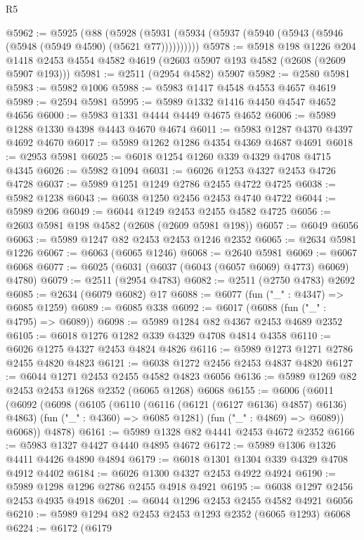 \begin{lexlean}{R5}
\begin{coremodule}
@5962 := @5925
    (@88 (@5928 (@5931 (@5934 (@5937 (@5940 (@5943 (@5946 (@5948 (@5949 @4590) (@5621 @77))))))))))
@5978 := @5918
    @198
    @1226
    @204
    @1418
    @2453
    @4554
    @4582
    @4619
    (@2603 @5907 @193 @4582 (@2608 (@2609 @5907 @193)))
@5981 := @2511 (@2954 @4582) @5907
@5982 := @2580 @5981
@5983 := @5982 @1006
@5988 := @5983 @1417 @4548 @4553 @4657 @4619
@5989 := @2594 @5981
@5995 := @5989 @1332 @1416 @4450 @4547 @4652 @4656
@6000 := @5983 @1331 @4444 @4449 @4675 @4652
@6006 := @5989 @1288 @1330 @4398 @4443 @4670 @4674
@6011 := @5983 @1287 @4370 @4397 @4692 @4670
@6017 := @5989 @1262 @1286 @4354 @4369 @4687 @4691
@6018 := @2953 @5981
@6025 := @6018 @1254 @1260 @339 @4329 @4708 @4715 @4345
@6026 := @5982 @1094
@6031 := @6026 @1253 @4327 @2453 @4726 @4728
@6037 := @5989 @1251 @1249 @2786 @2455 @4722 @4725
@6038 := @5982 @1238
@6043 := @6038 @1250 @2456 @2453 @4740 @4722
@6044 := @5989 @206
@6049 := @6044 @1249 @2453 @2455 @4582 @4725
@6056 := @2603 @5981 @198 @4582 (@2608 (@2609 @5981 @198))
@6057 := @6049 @6056
@6063 := @5989 @1247 @82 @2453 @2453 @1246 @2352
@6065 := @2634 @5981 @1226
@6067 := @6063 (@6065 @1246)
@6068 := @2640 @5981
@6069 := @6067 @6068
@6077 := @6025 (@6031 (@6037 (@6043 (@6057 @6069) @4773) @6069) @4780)
@6079 := @2511 (@2954 @4783)
@6082 := @2511 (@2750 @4783) @2692
@6085 := @2634 (@6079 @6082) @17
@6088 := @6077 (fun ("_" : @4347) => @6085 @1259)
@6089 := @6085 @338
@6092 := @6017 (@6088 (fun ("_" : @4795) => @6089))
@6098 := @5989 @1284 @82 @4367 @2453 @4689 @2352
@6105 := @6018 @1276 @1282 @339 @4329 @4708 @4814 @4358
@6110 := @6026 @1275 @4327 @2453 @4824 @4826
@6116 := @5989 @1273 @1271 @2786 @2455 @4820 @4823
@6121 := @6038 @1272 @2456 @2453 @4837 @4820
@6127 := @6044 @1271 @2453 @2455 @4582 @4823 @6056
@6136 := @5989 @1269 @82 @2453 @2453 @1268 @2352 (@6065 @1268) @6068
@6155 := @6006
    (@6011
      (@6092
        (@6098
          (@6105
            (@6110 (@6116 (@6121 (@6127 @6136) @4857) @6136) @4863)
            (fun ("_" : @4360) => @6085 @1281)
            (fun ("_" : @4869) => @6089))
          @6068))
      @4878)
@6161 := @5989 @1328 @82 @4441 @2453 @4672 @2352
@6166 := @5983 @1327 @4427 @4440 @4895 @4672
@6172 := @5989 @1306 @1326 @4411 @4426 @4890 @4894
@6179 := @6018 @1301 @1304 @339 @4329 @4708 @4912 @4402
@6184 := @6026 @1300 @4327 @2453 @4922 @4924
@6190 := @5989 @1298 @1296 @2786 @2455 @4918 @4921
@6195 := @6038 @1297 @2456 @2453 @4935 @4918
@6201 := @6044 @1296 @2453 @2455 @4582 @4921 @6056
@6210 := @5989 @1294 @82 @2453 @2453 @1293 @2352 (@6065 @1293) @6068
@6224 := @6172
    (@6179

\end{coremodule}
\end{lexlean}
